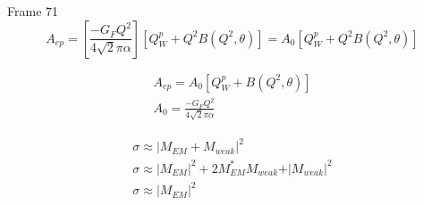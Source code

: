 \documentclass[xcolor=x11names,compress,8pt]{beamer}
\renewcommand{\(}{\begin{columns}}
\renewcommand{\)}{\end{columns}}
\newcommand{\<}[1]{\begin{column}{#1}}
\renewcommand{\>}{\end{column}}
\begin{document}
\begin{frame}{Frame 71}
\begin{equation} \label{equ:qweak5}
A_{ep} = \left[ \frac{-G_{F}Q^{2}}{4 \sqrt{2}\pi\alpha} \right] \left[ Q_{W}^{p} + Q^{2}B(Q^{2}, \theta) \right] = A_{0} \left[ Q_{W}^{p} + Q^{2}B(Q^{2}, \theta) \right]
\end{equation}

\begin{equation} \label{equ:qweak4}
\begin{split}
A_{ep} = A_{0} \left[ Q_{W}^{p} + B(Q^{2}, \theta) \right]\\
A_{0} = \frac{-G_{F}Q^{2}}{4 \sqrt{2}\pi\alpha}
\end{split}
\end{equation}


\begin{equation} \label{equ:qweak6}
\begin{split}
\sigma \approx \vert M_{EM} + M_{weak} \vert^{2} \\
\sigma \approx \vert M_{EM} \vert^{2} + 2M_{EM}^{*}M_{weak} + \vert M_{weak} \vert^{2}  \\
\sigma \approx \vert M_{EM} \vert^{2} 
\end{split}
\end{equation}

\end{frame}
\end{document}
